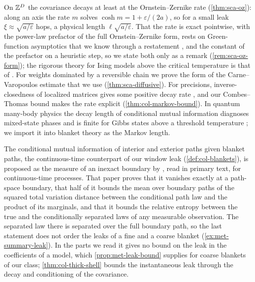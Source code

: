 On $\mathbb{Z}^D$ the covariance decays at least at the Ornstein--Zernike rate \citep{ornstein1914accidental} (\cref{thm:sca-oz}): along an axis the rate $m$ solves $\cosh m=1+\varepsilon/(2a)$, so for a small leak $\xi\approx\sqrt{a/\varepsilon}$ hops, a physical length $\ell\sqrt{a/\varepsilon}$. That the rate is exact pointwise, with the power-law prefactor of the full Ornstein--Zernike form, rests on Green-function asymptotics \citep{ney1966martin} that we know through a restatement \citep{ballu2024asymptotics}, and the constant of the prefactor on a heuristic step, so we state both only as a remark (\cref{rem:sca-oz-form}); the rigorous theory for Ising models above the critical temperature is that of \citet{campanino2003ornstein}. For weights dominated by a reversible chain we prove the form of the Carne--Varopoulos estimate that we use \citep{carne1985transmutation,varopoulos1985long} (\cref{thm:sca-diffusive}). For precisions, inverse-closedness of localized matrices gives some positive decay rate \citep{jaffard1990proprietes}, and our Combes--Thomas bound makes the rate explicit (\cref{thm:col-markov-bound}). In quantum many-body physics the decay length of conditional mutual information diagnoses mixed-state phases \citep{sang2025stability} and is finite for Gibbs states above a threshold temperature \citep{kuwahara2020clustering}; we import it into blanket theory as the Markov length.

The conditional mutual information of interior and exterior paths given blanket paths, the continuous-time counterpart of our window leak (\cref{def:col-blankets}), is proposed as the measure of an inexact boundary by \citet{sakthivadivel2026nonequilibrium}, read in primary text, for continuous-time processes. That paper proves that it vanishes exactly at a path-space boundary, that half of it bounds the mean over boundary paths of the squared total variation distance between the conditional path law and the product of its marginals, and that it bounds the relative entropy between the true and the conditionally separated laws of any measurable observation. The separated law there is separated over the full boundary path, so the last statement does not order the leaks of a fine and a coarse blanket (\cref{ex:met-summary-leak}). In the parts we read it gives no bound on the leak in the coefficients of a model, which \cref{prop:met-leak-bound} supplies for coarse blankets of our class; \cref{thm:col-thick-shell} bounds the instantaneous leak through the decay and conditioning of the covariance.

